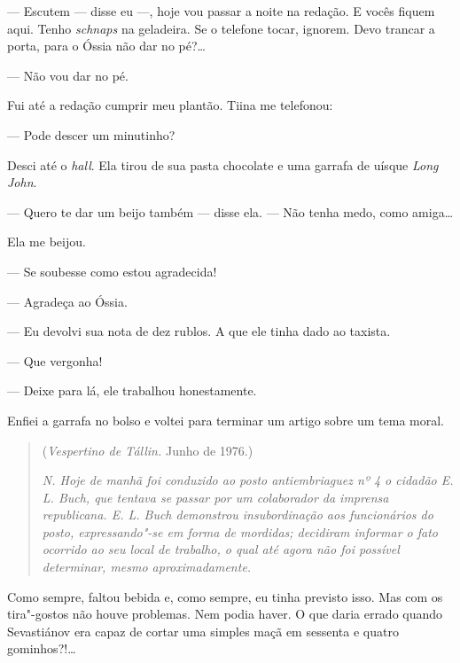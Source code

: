 --- Escutem --- disse eu ---, hoje vou passar a noite na redação. E
vocês fiquem aqui. Tenho \emph{schnaps} na geladeira. Se o telefone
tocar, ignorem. Devo trancar a porta, para o Óssia não dar no pé?\ldots{}

--- Não vou dar no pé.

Fui até a redação cumprir meu plantão. Tiina me telefonou:

--- Pode descer um minutinho?

Desci até o \emph{hall}. Ela tirou de sua pasta chocolate e uma garrafa
de uísque \emph{Long John}.

--- Quero te dar um beijo também --- disse ela. --- Não tenha medo, como
amiga\ldots{}

Ela me beijou.

--- Se soubesse como estou agradecida!

--- Agradeça ao Óssia.

--- Eu devolvi sua nota de dez rublos. A que ele tinha dado ao taxista.

--- Que vergonha!

--- Deixe para lá, ele trabalhou honestamente.

Enfiei a garrafa no bolso e voltei para terminar um artigo sobre um tema
moral.

\clearpage
\thispagestyle{empty}

\movetooddpage
\begin{center}
{}
\end{center}

\begin{quotation}
\begin{flushright}
(\emph{Vespertino de Tállin.} Junho de 1976.)
\end{flushright}
\vspace{4pt}
\noindent\emph{N. Hoje de manhã foi conduzido ao posto
antiembriaguez nº 4 o cidadão E. L. Buch, que tentava se passar por um
colaborador da imprensa republicana. E. L. Buch demonstrou
insubordinação aos funcionários do posto, expressando"-se em forma de
mordidas; decidiram informar o fato ocorrido ao seu local de trabalho, o
qual até agora não foi possível determinar, mesmo aproximadamente.}
\end{quotation}

Como sempre, faltou bebida e, como sempre, eu tinha previsto isso. Mas
com os tira"-gostos não houve problemas. Nem podia haver. O que daria
errado quando Sevastiánov era capaz de cortar uma simples maçã em
sessenta e quatro gominhos?!\ldots{}

